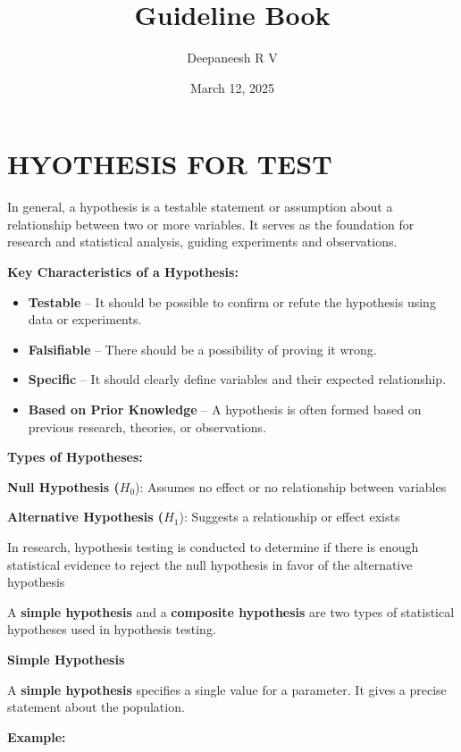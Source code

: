 \documentclass[
]{article}
\title{Guideline Book}
\author{Deepaneesh R V}
\date{March 12, 2025}
\begin{document}
\maketitle

{
\setcounter{tocdepth}{3}
\tableofcontents
}
\newpage

\section{HYOTHESIS FOR TEST}\label{hyothesis-for-test}

In general, a hypothesis is a testable statement or assumption about a
relationship between two or more variables. It serves as the foundation
for research and statistical analysis, guiding experiments and
observations.

\textbf{Key Characteristics of a Hypothesis:}

\begin{itemize}
\item
  \textbf{Testable} -- It should be possible to confirm or refute the
  hypothesis using data or experiments.
\item
  \textbf{Falsifiable} -- There should be a possibility of proving it
  wrong.
\item
  \textbf{Specific} -- It should clearly define variables and their
  expected relationship.
\item
  \textbf{Based on Prior Knowledge} -- A hypothesis is often formed
  based on previous research, theories, or observations.
\end{itemize}

\textbf{Types of Hypotheses:}

\textbf{Null Hypothesis (}\(H_0\)): Assumes no effect or no relationship
between variables

\textbf{Alternative Hypothesis (}\(H_1\)): Suggests a relationship or
effect exists

In research, hypothesis testing is conducted to determine if there is
enough statistical evidence to reject the null hypothesis in favor of
the alternative hypothesis

A \textbf{simple hypothesis} and a \textbf{composite hypothesis} are two
types of statistical hypotheses used in hypothesis testing.

\textbf{Simple Hypothesis}

A \textbf{simple hypothesis} specifies a single value for a parameter.
It gives a precise statement about the population.

\textbf{Example:}
\end{document}
